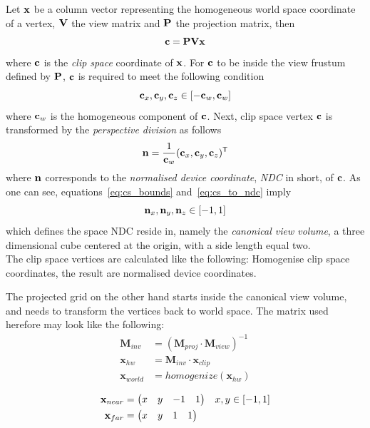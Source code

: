 Let $\mathbf{x}$ be a column vector representing the homogeneous world space
coordinate of a vertex, $\mathbf{V}$ the view matrix and $\mathbf{P}$ the
projection matrix, then
\begin{equation}
\label{eq:ws_to_cs}
 \mathbf{c} = \mathbf{P} \mathbf{V} \mathbf{x}
\end{equation}
where $\mathbf{c}$ is the \textit{clip space} coordinate of $\mathbf{x}$. For $\mathbf{c}$ to
be inside the view frustum defined by $\mathbf{P}$, $\mathbf{c}$ is required to
meet the following condition
\begin{equation}
\label{eq:cs_bounds}
 \mvecx{c}, \mvecy{c}, \mvecz{c} \in \interval{-\mvecw{c}}{\mvecw{c}}
\end{equation}
where $\mathbf{c}_w$ is the homogeneous component of $\mathbf{c}$. Next, clip space
vertex $\mathbf{c}$ is transformed by the \textit{perspective division} as follows
\begin{equation}
\label{eq:cs_to_ndc}
 \mathbf{n} = \frac{1}{\mathbf{c}_w}(\mathbf{c}_x, \mathbf{c}_y, \mathbf{c}_z)^\mathsf{T}
\end{equation}
where $\mathbf{n}$ corresponds to the \textit{normalised device coordinate},
\textit{NDC} in short, of $\mathbf{c}$. As one can see, equations~\ref{eq:cs_bounds}
and~\ref{eq:cs_to_ndc} imply
\begin{equation}
\label{eq:ndc_bounds}
 \mvecx{n}, \mvecy{n}, \mvecz{n} \in \interval{-1}{1}
\end{equation}
which defines the space NDC reside in, namely the \textit{canonical view volume},
a three dimensional cube centered at the origin, with a side length equal two.\\


The clip space vertices are calculated like the following:
Homogenise clip space coordinates, the result are normalised device coordinates.


The projected grid on the other hand starts inside the canonical view volume,
and needs to transform the vertices back to world space. The matrix used
herefore may look like the following:
\begin{align}
 \mathbf{M}_{inv}& = (\mathbf{M}_{proj} \cdot \mathbf{M}_{view})^{-1}\\
 \mathbf{x}_{hw}& = \mathbf{M}_{inv} \cdot \mathbf{x}_{clip}\\
 \mathbf{x}_{world}& = homogenize(\mathbf{x}_{hw})
\end{align}

\begin{align}
 \mathbf{x}_{near}& = \begin{pmatrix} x & y & -1 & 1 \end{pmatrix} && x,y \in \interval{-1}{1}\\
 \mathbf{x}_{far}& = \begin{pmatrix} x & y & 1 & 1 \end{pmatrix}
\end{align}


